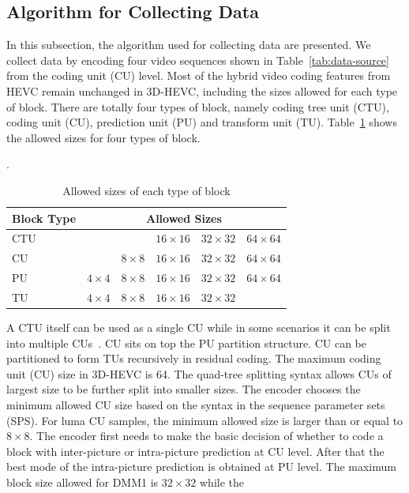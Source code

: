 \subsection{Algorithm for Collecting Data}\label{subsec:collecting-method}
In this subsection, the algorithm used for collecting data are presented.
We collect data by encoding four video sequences shown in
Table~\ref{tab:data-source} from the coding unit (CU) level.
Most of the hybrid video coding features from HEVC remain unchanged
in 3D-HEVC, including the sizes allowed for each type of block.
There are totally four types of block, namely coding tree unit (CTU),
coding unit (CU), prediction unit (PU) and transform unit (TU).
Table~\ref{tab:allowed-sizes-of-each-type-of-block} shows the allowed sizes
for four types of block.
\begin{table}[!htbp]
    \caption{Allowed sizes of 
    each type of block}\label{tab:allowed-sizes-of-each-type-of-block}.
    \bigskip
    \centering
    \begin{tabular}{l c c c c c}
        \toprule
        Block Type & \multicolumn{5}{c}{Allowed Sizes}\\
        \midrule
        CTU & & & $16\times16$ & $32\times32$ & $64\times64$\\
        CU  & & $8\times8$ & $16\times16$ & $32\times32$ & $64\times64$\\
        PU  & $4\times4$ & $8\times8$ & $16\times16$ & $32\times32$ & $64\times64$\\
        TU  & $4\times4$ & $8\times8$ & $16\times16$ & $32\times32$ & \\
        \bottomrule
    \end{tabular}
\end{table}
A CTU itself can be used as a single CU while in some scenarios it can
be split into multiple CUs~\parencite{RN46}.
CU sits on top the PU partition structure.
CU can be partitioned to form TUs recursively in residual coding.
The maximum coding unit (CU) size in 3D-HEVC is 64.
The quad-tree splitting syntax allows CUs of largest size to be further
split into smaller sizes.
The encoder chooses the minimum allowed CU size based on the syntax in
the sequence parameter sets (SPS).
For luma CU samples, the minimum allowed size is larger than or equal to
$8\times8$.
The encoder first needs to make the basic decision of whether to code a
block with inter-picture or intra-picture prediction at CU level.
After that the best mode of the intra-picture prediction is
obtained at PU level.
The maximum block size allowed for DMM1 is $32\times32$ while the
